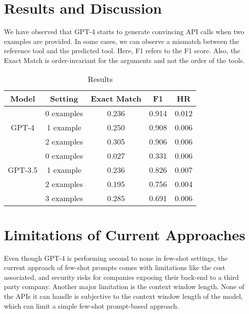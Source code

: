 \documentclass[10pt,twocolumn,letterpaper]{article}
\begin{document}
\section{Results and Discussion}
We have observed that GPT-4 starts to generate convincing API calls when two examples are provided. In some cases, we can observe a mismatch between the reference tool and the predicted tool. Here, F1 refers to the F1 score. Also, the Exact Match is order-invariant for the arguments and not the order of the tools.

\begin{table}[htp]
\centering
\begin{tabular}{|c|c|c|c|c|}
\hline
\textbf{Model} & \textbf{Setting} & \textbf{Exact Match} & \textbf{F1} & \textbf{HR} \\ \hline
\multirow{3}{*}{GPT-4} & 0 examples & 0.236 & 0.914 & 0.012\\
\cline{2-5}
 & 1 example & 0.250 & 0.908 & 0.006\\
\cline{2-5}
& 2 examples & 0.305 & 0.906 & 0.006\\
\hline
\multirow{3}{*}{GPT-3.5} & 0 examples & 0.027 & 0.331 & 0.006\\
\cline{2-5}
 & 1 example & 0.236 & 0.826 & 0.007\\
\cline{2-5}
& 2 examples & 0.195 & 0.756 & 0.004\\
\cline{2-5}
& 3 examples & 0.285 & 0.691 & 0.006\\
\hline
\end{tabular}
\caption{Results}
\end{table}


\section{Limitations of Current Approaches}
Even though GPT-4 is performing second to none in few-shot settings, the current approach of few-shot prompts comes with limitations like the cost associated, and security risks for companies exposing their back-end to a third party company. Another major limitation is the context window length. None of the APIs it can handle is subjective to the context window length of the model, which can limit a simple few-shot prompt-based approach.
\end{document}
